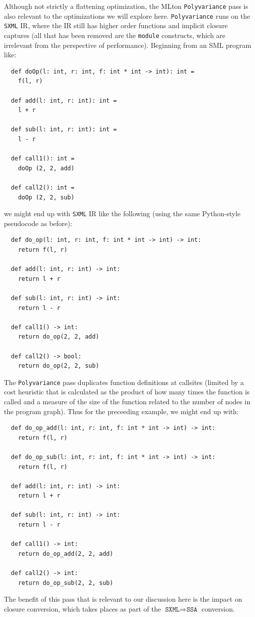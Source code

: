 \documentclass[leqno,11pt]{article}
\begin{document}
Although not strictly a flattening optimization, the MLton \texttt{Polyvariance}
pass is also relevant to the optimizations we will explore here.
\texttt{Polyvariance} runs on the \texttt{SXML} IR, where the IR still has
higher order functions and implicit closure captures (all that has been removed
are the \texttt{module} constructs, which are irrelevant from the perspective of
performance). Beginning from an SML program like:
\begin{verbatim}
  def doOp(l: int, r: int, f: int * int -> int): int =
    f(l, r)

  def add(l: int, r: int): int =
    l + r

  def sub(l: int, r: int): int =
    l - r

  def call1(): int =
    doOp (2, 2, add)

  def call2(): int =
    doOp (2, 2, sub)
\end{verbatim}
we might end up with \texttt{SXML} IR like the following (using the same
Python-style pseudocode as before):
\begin{verbatim}
  def do_op(l: int, r: int, f: int * int -> int) -> int:
    return f(l, r)

  def add(l: int, r: int) -> int:
    return l + r

  def sub(l: int, r: int) -> int:
    return l - r

  def call1() -> int:
    return do_op(2, 2, add)

  def call2() -> bool:
    return do_op(2, 2, sub)
\end{verbatim}
The \texttt{Polyvariance} pass duplicates function definitions at callsites
(limited by a cost heuristic that is calculated as the product of how many times
the function is called and a measure of the size of the function related to the
number of nodes in the program graph). Thus for the preceeding example, we might
end up with:
\begin{verbatim}
  def do_op_add(l: int, r: int, f: int * int -> int) -> int:
    return f(l, r)

  def do_op_sub(l: int, r: int, f: int * int -> int) -> int:
    return f(l, r)

  def add(l: int, r: int) -> int:
    return l + r

  def sub(l: int, r: int) -> int:
    return l - r

  def call1() -> int:
    return do_op_add(2, 2, add)

  def call2() -> int:
    return do_op_sub(2, 2, sub)
\end{verbatim}
The benefit of this pass that is relevant to our discussion here is the impact
on closure conversion, which takes places as part of the $\texttt{SXML}
\Rightarrow \texttt{SSA}$ conversion.
\end{document}
